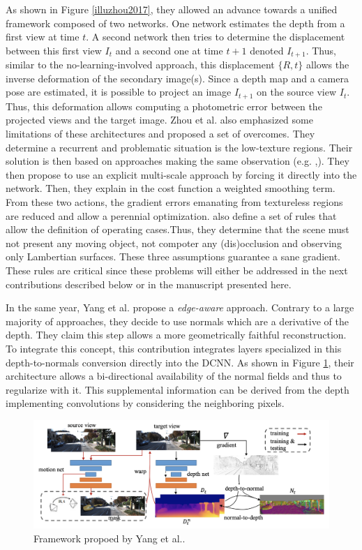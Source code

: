 As shown in Figure \ref{illuzhou2017}, they allowed an advance towards a unified framework composed of two networks. One network estimates the depth from a first view at time $t$. A second network then tries to determine the displacement between this first view $I_t$ and a second one at time $t+1$ denoted $I_{t+1}$. Thus, similar to the no-learning-involved approach, this displacement $\{R,t\}$ allows the inverse deformation of the secondary image(s). Since a depth map and a camera pose are estimated, it is possible to project an image $I_{t+1}$ on the source view $I_{t}$. Thus, this deformation allows computing a photometric error between the projected views and the target image. Zhou et al. also emphasized some limitations of these architectures and proposed a set of overcomes. They determine a recurrent and problematic situation is the low-texture regions. Their solution is then based on approaches making the same observation (e.g. \cite{garg2016unsupervised},\cite{godard2017unsupervised}). They then propose to use an explicit multi-scale approach by forcing it directly into the network. Then, they explain in the cost function a weighted smoothing term. From these two actions, the gradient errors emanating from textureless regions are reduced and allow a perennial optimization. \cite{zhou2017unsupervised} also define a set of rules that allow the definition of operating cases.Thus, they determine that the scene must not present any moving object, not compoter any (dis)occlusion and observing only Lambertian surfaces. These three assumptions guarantee a sane gradient. 
These rules are critical since these problems will either be addressed in the next contributions described below or in the manuscript presented here.


In the same year, Yang et al. \cite{yang2017unsupervised} propose a \emph{edge-aware} approach. Contrary to a large majority of approaches, they decide to use normals which are a derivative of the depth. They claim this step allows a more geometrically faithful reconstruction. To integrate this concept, this contribution integrates layers specialized in this depth-to-normals conversion directly into the DCNN. As shown in Figure \ref{illuyang2017}, their architecture allows a bi-directional availability of the normal fields and thus to regularize with it.
This supplemental information can be derived from the depth implementing convolutions by considering the neighboring pixels.

\begin{figure}[h]
	\centering
	\includegraphics[width=0.8\linewidth]{Figures/SOA/illuyang2017}
	\caption[Framework propoed by Yang et al.]{Framework propoed by Yang et al.\cite{yang2017unsupervised}.}
	\label{illuyang2017}
\end{figure}


